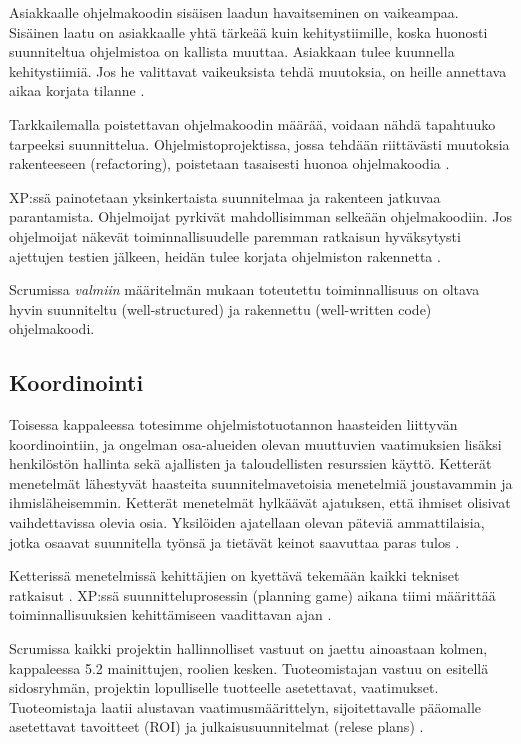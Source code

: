 \documentclass[finnish]{tktltiki2}
\theoremstyle{definition}
\theoremstyle{remark}
\begin{document}
Asiakkaalle ohjelmakoodin sisäisen laadun havaitseminen on vaikeampaa. Sisäinen laatu on asiakkaalle yhtä tärkeää kuin kehitystiimille, koska huonosti suunniteltua ohjelmistoa on kallista muuttaa. Asiakkaan tulee kuunnella kehitystiimiä. Jos he valittavat vaikeuksista tehdä muutoksia, on heille annettava aikaa korjata tilanne \cite{FOW01b}.

Tarkkailemalla poistettavan ohjelmakoodin määrää, voidaan nähdä tapahtuuko tarpeeksi suunnittelua. Ohjelmistoprojektissa, jossa tehdään riittävästi muutoksia rakenteeseen (refactoring), poistetaan tasaisesti huonoa ohjelmakoodia \cite{FOW01b}.

XP:ssä painotetaan yksinkertaista suunnitelmaa ja rakenteen jatkuvaa parantamista. Ohjelmoijat pyrkivät mahdollisimman selkeään ohjelmakoodiin. Jos ohjelmoijat näkevät toiminnallisuudelle paremman ratkaisun hyväksytysti ajettujen testien jälkeen, heidän tulee korjata ohjelmiston rakennetta \cite{BEC99}.

Scrumissa \textit{valmiin} määritelmän mukaan toteutettu toiminnallisuus on oltava hyvin suunniteltu (well-structured) ja rakennettu (well-written code) ohjelmakoodi\cite{SCH09}.

\subsection{Koordinointi}

Toisessa kappaleessa totesimme ohjelmistotuotannon haasteiden liittyvän koordinointiin, ja ongelman osa-alueiden olevan muuttuvien vaatimuksien lisäksi henkilöstön hallinta sekä ajallisten ja taloudellisten resurssien käyttö. Ketterät menetelmät lähestyvät haasteita suunnitelmavetoisia menetelmiä joustavammin ja ihmisläheisemmin. Ketterät menetelmät hylkäävät ajatuksen, että ihmiset olisivat vaihdettavissa olevia osia. Yksilöiden ajatellaan olevan päteviä ammattilaisia, jotka osaavat suunnitella työnsä ja tietävät keinot saavuttaa paras tulos \cite{FOW01a}.

Ketterissä menetelmissä kehittäjien on kyettävä tekemään kaikki tekniset ratkaisut \cite{FOW01a}.  XP:ssä suunnitteluprosessin (planning game) aikana tiimi määrittää toiminnallisuuksien kehittämiseen vaadittavan ajan \cite{BEC99}.

Scrumissa kaikki projektin hallinnolliset vastuut on jaettu ainoastaan kolmen, kappaleessa 5.2 mainittujen, roolien kesken. Tuoteomistajan vastuu on esitellä sidosryhmän, projektin lopulliselle tuotteelle asetettavat, vaatimukset. Tuoteomistaja laatii alustavan vaatimusmäärittelyn, sijoitettavalle pääomalle asetettavat tavoitteet (ROI) ja julkaisusuunnitelmat (relese plans) \cite{SCH09}.
\end{document}
